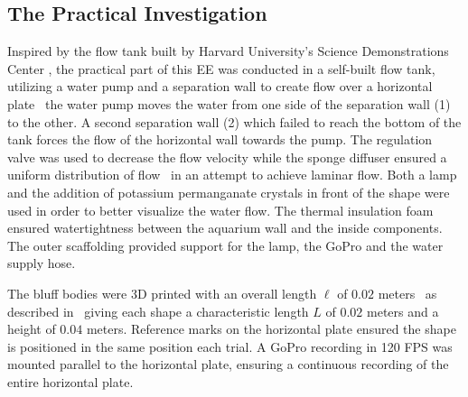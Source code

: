 \subsection{The Practical Investigation}
Inspired by the flow tank built by Harvard University’s Science Demonstrations Center \parencite{noauthor_vortex_nodate}, the practical part of this EE was conducted in a self-built flow tank, utilizing a water pump and a separation wall to create flow over a horizontal plate \textemdash\ the water pump moves the water from one side of the separation wall (1) to the other. A second separation wall (2) which failed to reach the bottom of the tank forces the flow of the horizontal wall towards the pump. The regulation valve was used to decrease the flow velocity while the sponge diffuser ensured a uniform distribution of flow \textemdash\ in an attempt to achieve laminar flow. Both a lamp and the addition of potassium permanganate crystals in front of the shape were used in order to better visualize the water flow. The thermal insulation foam ensured watertightness between the aquarium wall and the inside components. The outer scaffolding provided support for the lamp, the GoPro and the water supply hose. 

The bluff bodies were 3D printed with an overall length $\ell$ of $0.02$ meters \textemdash\ as described in  \textemdash\ giving each shape a characteristic length $L$ of $0.02$ meters and a height of $0.04$ meters. Reference marks on the horizontal plate ensured the shape is positioned in the same position each trial. A GoPro recording in 120 FPS was mounted parallel to the horizontal plate, ensuring a continuous recording of the entire horizontal plate.


